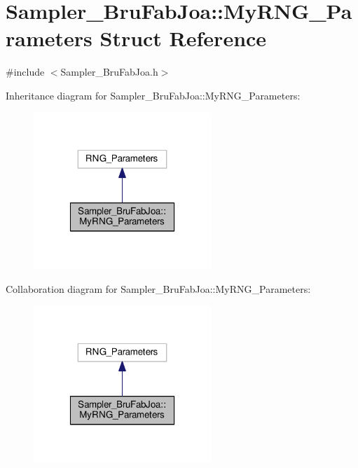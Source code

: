 \hypertarget{struct_sampler___bru_fab_joa_1_1_my_r_n_g___parameters}{\section{Sampler\-\_\-\-Bru\-Fab\-Joa\-:\-:My\-R\-N\-G\-\_\-\-Parameters Struct Reference}
\label{struct_sampler___bru_fab_joa_1_1_my_r_n_g___parameters}
}


{\ttfamily \#include $<$Sampler\-\_\-\-Bru\-Fab\-Joa.\-h$>$}



Inheritance diagram for Sampler\-\_\-\-Bru\-Fab\-Joa\-:\-:My\-R\-N\-G\-\_\-\-Parameters\-:\nopagebreak
\begin{figure}[H]
\begin{center}
\leavevmode
\includegraphics[width=190pt]{struct_sampler___bru_fab_joa_1_1_my_r_n_g___parameters__inherit__graph}
\end{center}
\end{figure}


Collaboration diagram for Sampler\-\_\-\-Bru\-Fab\-Joa\-:\-:My\-R\-N\-G\-\_\-\-Parameters\-:\nopagebreak
\begin{figure}[H]
\begin{center}
\leavevmode
\includegraphics[width=190pt]{struct_sampler___bru_fab_joa_1_1_my_r_n_g___parameters__coll__graph}
\end{center}
\end{figure}
